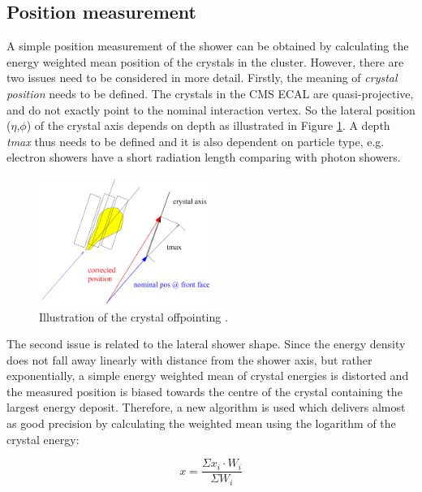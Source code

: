 \subsection{Position measurement}\label{subsec:electron_photon_position}

A simple position measurement of the shower can be obtained by calculating the energy weighted mean position of the crystals in the cluster. However, there are two issues need to be considered in more detail. Firstly, the meaning of \textit{crystal position} needs to be defined. The crystals in the CMS ECAL are quasi-projective, and do not exactly point to the nominal interaction vertex. So the lateral position ($\eta$,$\phi$) of the crystal axis depends on depth as illustrated in Figure \ref{fig:cluster-position}. A depth \textit{tmax} thus needs to be defined and it is also dependent on particle type, e.g. electron showers have a short radiation length comparing with photon showers.

\begin{figure}[h!]
\begin{center}
\includegraphics[width=0.5\textwidth]{figures/Reconstruction/Electron_photon/Position.png}
\caption{Illustration of the crystal offpointing \cite{CMS-Note-2001-034}.}
\label{fig:cluster-position}
\end{center}
\end{figure}


The second issue is related to the lateral shower shape. Since the energy density does not fall away linearly with distance from the shower axis, but rather exponentially, a simple energy weighted mean of crystal energies is distorted and the measured position is biased towards the centre of the crystal containing the largest energy deposit. Therefore, a new algorithm is used which delivers almost as good precision by calculating the weighted mean using the logarithm of the crystal energy:

\begin{equation}
x=\frac{\Sigma x_{i}\cdot W_{i}}{\Sigma W_{i}}
\label{eq:logarithm}
\end{equation}

